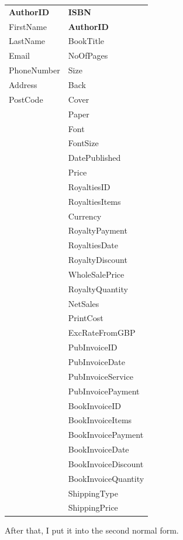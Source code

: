 \begin{tabular}{|p{2.5cm}|p{3.5cm}|}
    \hline
    \textbf{AuthorID} & \textbf{ISBN} \\
    FirstName & \textbf{AuthorID} \\
    LastName & BookTitle \\
    Email & NoOfPages \\
    PhoneNumber & Size \\
    Address & Back \\
    PostCode & Cover \\
    & Paper \\
    & Font \\
    & FontSize \\
    & DatePublished\\
    & Price \\
    & RoyaltiesID \\
    & RoyaltiesItems \\
    & Currency \\
    & RoyaltyPayment \\
    & RoyaltiesDate \\
    & RoyaltyDiscount \\
    & WholeSalePrice \\
    & RoyaltyQuantity \\
    & NetSales \\
    & PrintCost \\
    & ExcRateFromGBP \\
    & PubInvoiceID \\
    & PubInvoiceDate \\
    & PubInvoiceService \\
    & PubInvoicePayment \\
    & BookInvoiceID \\
    & BookInvoiceItems \\
    & BookInvoicePayment \\
    & BookInvoiceDate \\
    & BookInvoiceDiscount \\
    & BookInvoiceQuantity \\
    & ShippingType \\
    & ShippingPrice \\
    \hline
\end{tabular}

\newpage
After that, I put it into the second normal form.

